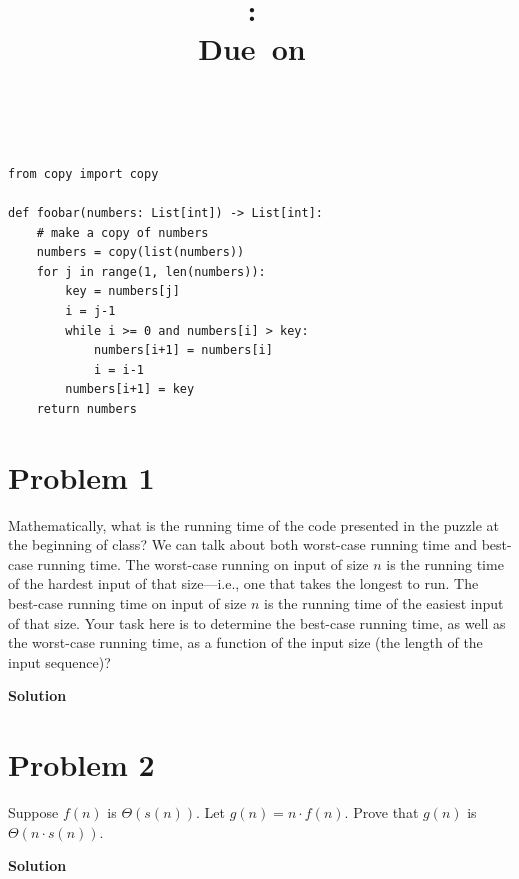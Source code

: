 \documentclass{article}
\title{
    \vspace{2in}
    \textmd{\textbf{\hmwkClass:\ \hmwkTitle}}\\
    \normalsize\vspace{0.1in}\small{Due\ on\ \hmwkDueDate}\\
    \vspace{0.1in}\large{\textit{\hmwkClassInstructor\ \hmwkClassTime}}
    \vspace{3in}
}
\author{\hmwkAuthorName}
\date{}
\newcommand{\solution}{\textbf{\large Solution}}
\theoremstyle{remark}
\begin{document}
\maketitle
\newpage

\begin{verbatim}
from copy import copy

def foobar(numbers: List[int]) -> List[int]:
    # make a copy of numbers
    numbers = copy(list(numbers))
    for j in range(1, len(numbers)):
        key = numbers[j]
        i = j-1
        while i >= 0 and numbers[i] > key:
            numbers[i+1] = numbers[i]
            i = i-1
        numbers[i+1] = key
    return numbers
\end{verbatim}

\section*{Problem 1}

Mathematically, what is the running time of the code presented in the puzzle at the beginning of class? We can talk about both worst-case running time and best-case running time. The worst-case running on input of size $n$ is the running time of the hardest input of that size---i.e., one that takes the longest to run. The best-case running time on input of size $n$ is the running time of the easiest input of that size. Your task here is to determine the best-case running time, as well as the worst-case running time, as a function of the input size (the length of the input sequence)?

\medskip
\solution

\vspace{1em}
\hrulefill

\section*{Problem 2}

Suppose $f(n)$ is $\Theta(s(n))$. Let $g(n) = n \cdot f(n)$. Prove that $g(n)$ is $\Theta(n \cdot s(n))$.

\medskip
\solution
\end{document}
